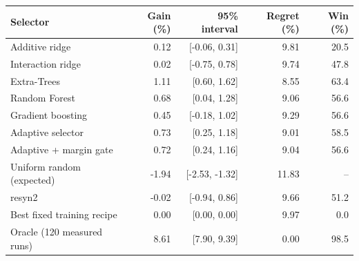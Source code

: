 \begin{tabular}{@{}lrrrr@{}}
\toprule
\textbf{Selector} & \textbf{Gain (\%)} & \textbf{95\% interval} & \textbf{Regret (\%)} & \textbf{Win (\%)} \\
\midrule
Additive ridge & 0.12 & [-0.06, 0.31] & 9.81 & 20.5 \\
Interaction ridge & 0.02 & [-0.75, 0.78] & 9.74 & 47.8 \\
Extra-Trees & 1.11 & [0.60, 1.62] & 8.55 & 63.4 \\
Random Forest & 0.68 & [0.04, 1.28] & 9.06 & 56.6 \\
Gradient boosting & 0.45 & [-0.18, 1.02] & 9.29 & 56.6 \\
Adaptive selector & 0.73 & [0.25, 1.18] & 9.01 & 58.5 \\
Adaptive + margin gate & 0.72 & [0.24, 1.16] & 9.04 & 56.6 \\
Uniform random (expected) & -1.94 & [-2.53, -1.32] & 11.83 & -- \\
resyn2 & -0.02 & [-0.94, 0.86] & 9.66 & 51.2 \\
Best fixed training recipe & 0.00 & [0.00, 0.00] & 9.97 & 0.0 \\
Oracle (120 measured runs) & 8.61 & [7.90, 9.39] & 0.00 & 98.5 \\
\bottomrule
\end{tabular}
